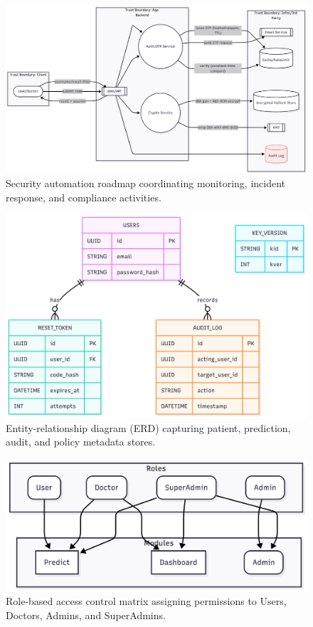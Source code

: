 \documentclass[12pt]{article}
\begin{document}
\begin{figure}[t]
  \centering
  \includegraphics[width=0.9\linewidth]{sa.png}
  \caption{Security automation roadmap coordinating monitoring, incident response, and compliance activities.}
  \label{fig:security_automation}
\end{figure}

\begin{figure}[t]
  \centering
  \includegraphics[width=0.9\linewidth]{database_erd.png}
  \caption{Entity-relationship diagram (ERD) capturing patient, prediction, audit, and policy metadata stores.}
  \label{fig:database_erd}
\end{figure}

\begin{figure}[t]
  \centering
  \includegraphics[width=0.85\linewidth]{role_based_access_control_rbac.png}
  \caption{Role-based access control matrix assigning permissions to Users, Doctors, Admins, and SuperAdmins.}
  \label{fig:rbac}
\end{figure}
\end{document}
